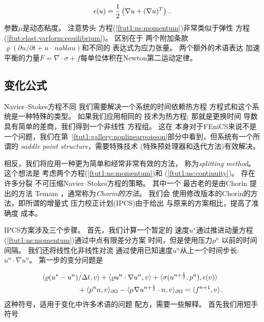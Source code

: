 
\[ \epsilon(u) = \frac{1}{2}\left(\nabla u + (\nabla u)^T\right)\thinspace .\]
参数$\mu$是动态粘度。 注意势头
方程(\ref{ftut1:ns:momentum})非常类似于弹性
方程(\ref{ftut:elast:varform:equilibrium})。 区别在于
两个附加条款$\varrho(\partial u/ \partial t + u \cdot \ nabla u)$和不同的
表达式为应力张量。 两个额外的术语表达
加速平衡的力量$F = \nabla\cdot\sigma + f$每单位体积在Newton第二运动定律。

\subsection{变化公式}
\label{ftut1:NS:varform}

Navier--Stokes方程不同
我们需要解决一个系统的时间依赖热方程
方程式和这个系统是一种特殊的类型。 如果我们应用相同的
技术为热方程; 那就是更换时间
导数具有简单的差商，我们得到一个非线性
方程组。 这在
本身对于FEniCS来说不是一个问题，我们在第~\ref{ftut1:gallery:nonlinearpoisson}部分中看到，但系统有一个所谓的
\emph{saddle point structure}，需要特殊技术
(特殊预处理器和迭代方法)有效解决。


相反，我们将应用一种更为简单和经常非常有效的方法，
称为\emph{splitting method}。 这个想法是
考虑两个方程(\ref{ftut1:ns:momentum})和
(\ref{ftut1:ns:continuity})。 存在许多分裂
不可压缩Navier--Stokes方程的策略。 其中一个
最古老的是由Chorin \cite{Chorin1968}提出的方法
Temam \cite{Temam1969}，通常称为\emph{Chorin的方法}。 我们会
使用修改版本的Chorin的方法，即所谓的增量式
压力校正计划(IPCS)由于\cite{Goda1979}给出
与原来的方案相比，提高了准确度
成本。

IPCS方案涉及三个步骤。 首先，我们计算一个暂定的
速度$u^{\star}$通过推进动量方程
(\ref{ftut1:ns:momentum})通过中点有限差分方案
时间，但是使用压力$p^{n}$
以前的时间间隔。 我们还将线性化非线性对流
通过使用已知速度$u^{n}$从上一个时间步长:
$u^{n}\cdot\nabla u^{n}$。
第一步的变分问题是

\begin{align}
\label{ftut1:ipcs1}
      & \langle {\varrho(u^{\star} - u^{n}) / \Delta t},{v} \rangle
      + \langle {\varrho u^{n} \cdot \nabla u^{n}},{v} \rangle
      + \nonumber
        \langle {\sigma(u^{n+\frac{1}{2}}, p^{n})},{\epsilon(v)} \rangle \\
      &\quad\quad\quad\quad\quad
      + \langle {p^{n} n},{v} \rangle_{\partial\Omega}
      - \langle {\mu\nabla u^{n+\frac{1}{2}}\cdot n},{v} \rangle_{\partial\Omega}
      = \langle {f^{n+1}},{v} \rangle.
\end{align}
这种符号，适用于变化中许多术语的问题
配方，需要一些解释。 首先我们用短手
符号

